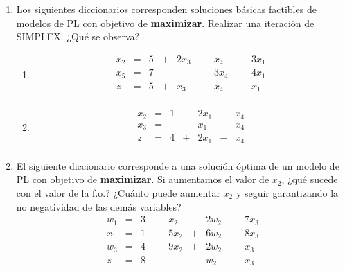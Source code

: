 \documentclass[12pt]{article}
\theoremstyle{definition}
\begin{document}
\begin{enumerate}
    \item Los siguientes diccionarios corresponden soluciones básicas factibles de modelos de PL con objetivo de
    \textbf{maximizar}.
    Realizar una iteración de SIMPLEX. ¿Qué se observa?
        \begin{enumerate}[label=\alph*)]
        \item  \[
        \begin{array}{ccccccccc}
            x_2 & = & 5 & + & 2x_3 & - & x_4  & - & 3x_1 \\
            x_5 & = & 7 &   &      & - & 3x_4 & - & 4x_1 \\ \hline
            z   & = & 5 & + & x_3  & - & x_4  & - & x_1  \\
        \end{array}
        \]
        \item
        \[
        \begin{array}{ccccccccc}
            x_2 & = & 1 & - & 2x_1 & - & x_4   \\
            x_3 & = &     & - & x_1 & - & x_4\\ \hline
            z   & = & 4   & + & 2x_1 & - & x_4\\
        \end{array}
        \]
        \end{enumerate}
    \item El siguiente diccionario corresponde a una solución óptima de un modelo de PL con objetivo de
    \textbf{maximizar}.
    Si aumentamos el valor de $x_2$, ¿qué sucede con el valor de la f.o.? ¿Cuánto puede aumentar $x_2$ y seguir
    garantizando la no negatividad de las demás variables?
        \[
        \begin{array}{ccccccccc}
            w_1 & = & 3 & + & x_2  & - & 2w_2 & + & 7x_3 \\
            x_1 & = & 1 & - & 5x_2 & + & 6w_2 & - & 8x_3 \\
            w_3 & = & 4 & + & 9x_2 & + & 2w_2 & - & x_3  \\ \hline
            z   & = & 8 &   &      & - & w_2  & - & x_3  \\
        \end{array}
        \]
\end{enumerate}
\end{document}
